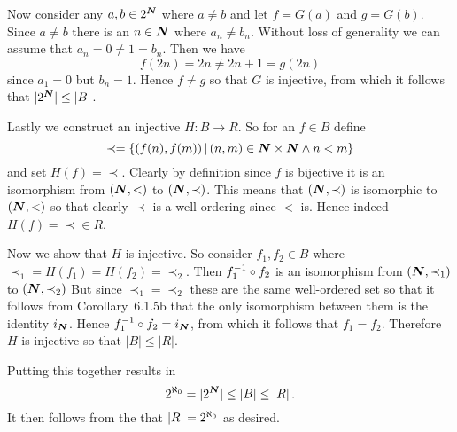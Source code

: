 {{    Now consider any $a, b \in 2^{\boldsymbol{N}}$ where $a \neq b$ and let $f = G(a)$ and $g = G(b)$.
    Since $a \neq b $ there is an $n \in {\boldsymbol{N}}$ where $a_n \neq b_n$.
    Without loss of generality we can assume that $a_n = 0 \neq 1 = b_n$.
    Then we have
    $$
    f(2n) = 2n \neq 2n+1 = g(2n)
    $$
    since $a_1 = 0$ but $b_n = 1$.
    Hence $f \neq g$ so that $G$ is injective, from which it follows that $|2^{\boldsymbol{N}}| \leq |B|$.

    Lastly we construct an injective $H : B \to R$.
    So for an $f \in B$ define
    $$
    \prec = \left\{ (f(n), f(m)) \,|\, (n,m) \in {\boldsymbol{N}} \times {\boldsymbol{N}} \land n < m \right\}
    $$
    and set $H(f) = \prec$.
    Clearly by definition since $f$ is bijective it is an isomorphism from $({\boldsymbol{N}}, <)$ to $({\boldsymbol{N}}, \prec)$.
    This means that $({\boldsymbol{N}}, \prec)$ is isomorphic to $({\boldsymbol{N}}, <)$ so that clearly $\prec$ is a well-ordering since $<$ is.
    Hence indeed $H(f) = \prec \in R$.

    Now we show that $H$ is injective.
    So consider $f_1, f_2 \in B$ where $\prec_1 = H(f_1) = H(f_2) = \prec_2$.
    Then $f_1^{-1} \circ f_2$ is an isomorphism from $({\boldsymbol{N}}, \prec_1)$ to $({\boldsymbol{N}}, \prec_2)$
    But since $\prec_1 = \prec_2$ these are the same well-ordered set so that it follows from Corollary~6.1.5b that the only isomorphism between them is the identity $i_{\boldsymbol{N}}$.
    Hence $f_1^{-1} \circ f_2 = i_{\boldsymbol{N}}$, from which it follows that $f_1 = f_2$.
    Therefore $H$ is injective so that $|B| \leq |R|$.

    Putting this together results in
    $$
    {2^{\aleph_0}} = |2^{\boldsymbol{N}}| \leq |B| \leq |R| \,.
    $$
    It then follows from the \cbthrm{} that $|R| = {2^{\aleph_0}}$ as desired.
  }
}

